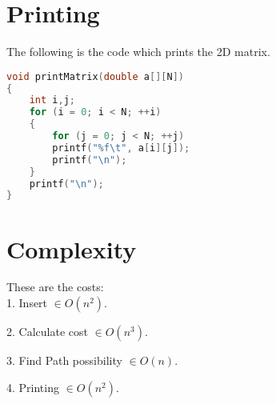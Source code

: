 \documentclass{article}
\begin{document}
\section{Printing}

The following is the code which prints the 2D matrix.

\begin{lstlisting}[language=c, caption=print]
void printMatrix(double a[][N])
{
    int i,j;
    for (i = 0; i < N; ++i)
    {
        for (j = 0; j < N; ++j)
        printf("%f\t", a[i][j]);
        printf("\n");
    }
    printf("\n");
}
\end{lstlisting}

\section{Complexity}

These are the costs: \\

1. Insert  $\in O(n^2)$.

2. Calculate cost  $\in O(n^3)$.

3. Find Path possibility  $\in O(n)$.

4. Printing $\in O(n^2)$.
\end{document}
